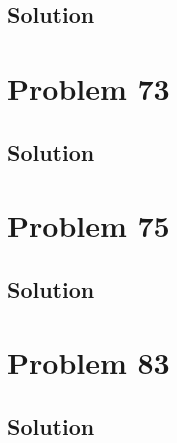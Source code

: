\documentclass[12pt]{article}
\begin{document}
        \subsection{Solution}

    \pagebreak
    \section{Problem 73}

        \subsection{Solution}

    \pagebreak
    \section{Problem 75}

        \subsection{Solution}

    \pagebreak
    \section{Problem 83}

        \subsection{Solution}

    \pagebreak

    \tableofcontents
    
\end{document}
